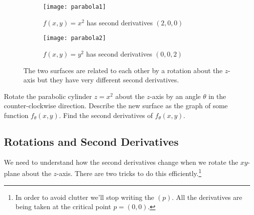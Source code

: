 \begin{figure}[H]
  \centering
  \begin{subfigure}[t]{0.495\textwidth}
    \centering
    \texttt{[image: parabola1]}
    \caption{$ f(x,y) = x^2 $ has second derivatives $ (2,0,0)$}
  \end{subfigure}
  \begin{subfigure}[t]{0.495\textwidth}
    \centering
    \texttt{[image: parabola2]}
    \caption{$ f(x,y) = y^2 $ has second derivatives $ (0,0,2)$}
  \end{subfigure}
  \caption{The two surfaces are related to each other by a rotation about the $ z$-axis but they have very different second derivatives.}
\end{figure}

\begin{ques}
  \label{ques:paraboloid}
  Rotate the parabolic cylinder $z=x^2$ about the  $z$-axis by an angle $\theta$ in the counter-clockwise direction. Describe the new surface as the graph of some function $f_{\theta}(x,y)$. Find the second derivatives of $f_{\theta}(x,y)$.
\end{ques}






\subsection{Rotations and Second Derivatives}
We need to understand how the second derivatives change when we rotate the $ xy$-plane about the $ z$-axis. There are two tricks to do this efficiently.\footnote{In order to avoid clutter we'll stop writing the $ (p)$. All the derivatives are being taken at the critical point $p = (0,0)$.}

